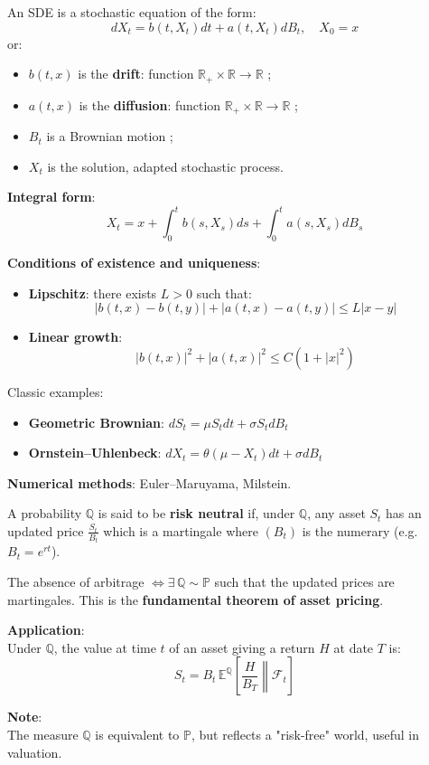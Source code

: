 \begin{f}
	
	An SDE is a stochastic equation of the form:
	\[
	dX_t = b(t, X_t) dt + a(t, X_t) dB_t, \quad X_0 = x
	\]
	or:
	\begin{itemize}
		\item \(b(t,x)\) is the \textbf{drift}: function \(\mathbb{R}_+ \times \mathbb{R} \to \mathbb{R}\) ;
		\item \(a(t,x)\) is the \textbf{diffusion}: function \(\mathbb{R}_+ \times \mathbb{R} \to \mathbb{R}\) ;
		\item \(B_t\) is a Brownian motion ;
		\item \(X_t\) is the solution, adapted stochastic process.
	\end{itemize}
	
	\textbf{Integral form}:
	\[
	X_t = x + \int_0^t b(s, X_s) ds + \int_0^t a(s, X_s) dB_s
	\]
	
	\textbf{Conditions of existence and uniqueness}:
	\begin{itemize}
		\item \textbf{Lipschitz}: there exists \(L > 0\) such that:
		\[
		|b(t,x) - b(t,y)| + |a(t,x) - a(t,y)| \leq L |x - y|
		\]
		\item \textbf{Linear growth}:
		\[
		|b(t,x)|^2 + |a(t,x)|^2 \leq C(1 + |x|^2)
		\]
	\end{itemize}
	
Classic examples:
	\begin{itemize}
		\item \textbf{Geometric Brownian}: \(dS_t = \mu S_t dt + \sigma S_t dB_t\)
		\item \textbf{Ornstein–Uhlenbeck}: \(dX_t = \theta(\mu - X_t) dt + \sigma dB_t\)
	\end{itemize}
	
	\textbf{Numerical methods}: Euler–Maruyama, Milstein.
	
\end{f}

\begin{f}
	
	A probability \(\mathbb{Q}\) is said to be \textbf{risk neutral} if, under \(\mathbb{Q}\), 
	any asset \(S_t\) has an updated price \( \frac{S_t}{B_t}\) which is a martingale
	where \((B_t)\) is the numerary (e.g. \(B_t = e^{rt}\)).
	
	The absence of arbitrage \(\iff \exists\, \mathbb{Q} \sim \mathbb{P}\) such that the updated prices are martingales.
	This is the \textbf{fundamental theorem of asset pricing}.
	
	\textbf{Application}:\\
	Under \(\mathbb{Q}\), the value at time \(t\) of an asset giving a return \(H\) at date \(T\) is:
	\[
	S_t = B_t\, \mathbb{E}^\mathbb{Q} \left[ \left. \frac{H}{B_T} \right\|  \mathcal{F}_t \right]
	\]
	
	\textbf{Note}:\\
	The measure \(\mathbb{Q}\) is equivalent to \(\mathbb{P}\), but reflects a "risk-free" world, useful in valuation.
	
\end{f}
\newcolumn

